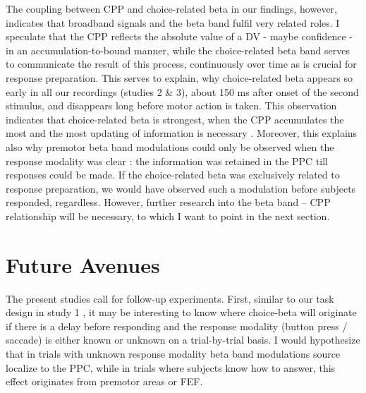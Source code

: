  The coupling between CPP and choice-related beta in our findings, however, indicates that broadband signals and the beta band fulfil very related roles. I speculate that the CPP reflects the absolute value of a DV - maybe confidence - in an accumulation-to-bound manner, while the choice-related beta band serves to communicate the result of this process, continuously over time as is crucial for response preparation. This serves to explain, why choice-related beta appears so early in all our recordings (studies 2 \& 3), about 150 ms after onset of the second stimulus, and disappears long before motor action is taken. This observation indicates that choice-related beta is strongest, when the CPP accumulates the most and the most updating of information is necessary \parencite{Twomey2015}. Moreover, this explains also why premotor beta band modulations could only be observed when the response modality was clear \parencite{Ludwig2018}: the information was retained in the PPC till responses could be made. If the choice-related beta was exclusively related to response preparation, we would have observed such a modulation before subjects responded, regardless. However, further research into the beta band – CPP relationship will be necessary, to which I want to point in the next section.
 
\section{Future Avenues}

The present studies call for follow-up experiments. 
First, similar to our task design in study 1 \parencite[see attached study: ][]{VonLautz2017}, it may be interesting to know where choice-beta will originate if there is a delay before responding and the response modality (button press / saccade) is either known or unknown on a trial-by-trial basis. I would hypothesize that in trials with unknown response modality beta band modulations source localize to the PPC, while in trials where subjects know how to answer, this effect originates from premotor areas or FEF.

